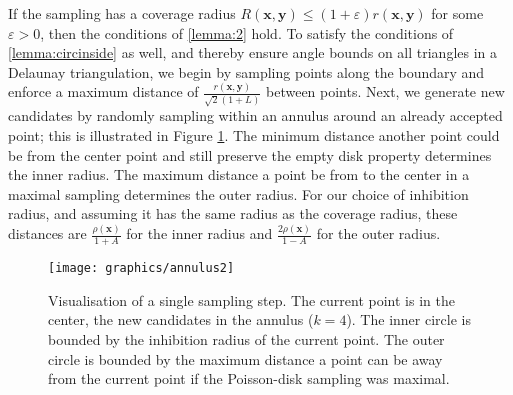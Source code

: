 \documentclass[preprint, 10pt]{elsarticle}
\newcommand{\vx}{{\mathbf x}}
\newcommand{\vy}{{\mathbf y}}
\theoremstyle{definition}
\theoremstyle{remark}
\begin{document}
If the sampling has a coverage radius $R(\vx,\vy)\le (1+\varepsilon)r(\vx,\vy)$ for some $\varepsilon>0$, then the conditions of \eqref{lemma:2} hold. 
To satisfy the conditions of \eqref{lemma:circinside} as well, and thereby ensure angle bounds on all triangles in a Delaunay triangulation, we begin by sampling points along the boundary and enforce a maximum distance of $\frac{r(\vx,\vy)}{\sqrt{2}(1+L)}$ between points.
Next, we generate new candidates by randomly sampling within an annulus around an already accepted point; this is illustrated in Figure \ref{fig:annulus}.  
The minimum distance another point could be from the center point and still preserve the empty disk property determines the inner radius.  
The maximum distance a point be from to the center in a maximal sampling determines the outer radius.
For our choice of inhibition radius, and assuming it has the same radius as the coverage radius, these distances are $\frac{\rho(\vx)}{1+A}$ for the inner radius and $\frac{2\rho(\vx)}{1-A}$ for the outer radius.

\begin{figure}
	\centering
	\texttt{[image: graphics/annulus2]}
	\caption{Visualisation of a single sampling step. The current point is in the center, the new candidates in the annulus ($k=4$). The inner circle is bounded by the inhibition radius of the current point. The outer circle is bounded by the maximum distance a point can be away from the current point if the Poisson-disk sampling was maximal. }
    \label{fig:annulus}
\end{figure}
\end{document}
